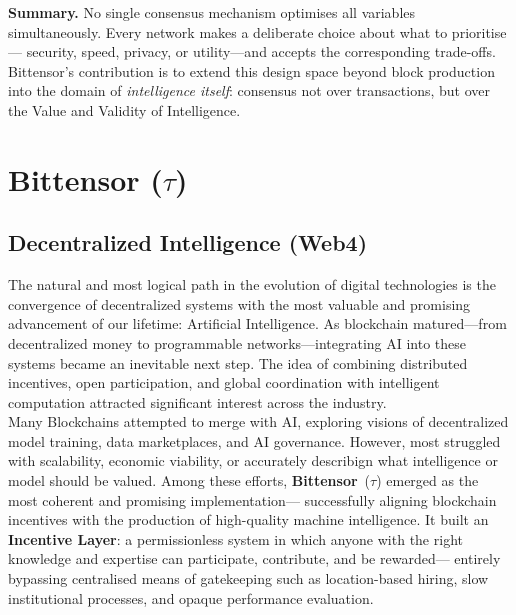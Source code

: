 \documentclass[12pt, a4paper, oneside]{report}
\newcommand{\TAO}{$\tau$}            %
\theoremstyle{definition}
\begin{document}
\vspace{0.4cm}
\noindent\textbf{Summary.} No single consensus mechanism optimises all variables 
simultaneously. Every network makes a deliberate choice about what to prioritise—
security, speed, privacy, or utility—and accepts the corresponding trade-offs. 
Bittensor's contribution is to extend this design space beyond block production 
into the domain of \emph{intelligence itself}: consensus not over transactions, 
but over the Value and Validity of Intelligence.








\chapter{Bittensor (\TAO)}
\label{chap:bittensor}

\section{Decentralized Intelligence (Web4)}
\label{sec:web4}

The natural and most logical path in the evolution of digital technologies is the 
convergence of decentralized systems with the most valuable and promising advancement 
of our lifetime: Artificial Intelligence. As blockchain matured—from decentralized 
money to programmable networks—integrating AI into these systems became an inevitable 
next step. The idea of combining distributed incentives, open participation, and global 
coordination with intelligent computation attracted significant interest across the 
industry.\\[0.4cm]

Many Blockchains attempted to merge with AI, exploring visions of decentralized 
model training, data marketplaces, and AI governance. However, most struggled with 
scalability, economic viability, or accurately describign what intelligence or model should be valued. Among these efforts, 
\textbf{Bittensor}~(\TAO) emerged as the most coherent and promising implementation—
successfully aligning blockchain incentives with the production of high-quality machine 
intelligence. It built an \textbf{Incentive Layer}: a permissionless system in which anyone 
with the right knowledge and expertise can participate, contribute, and be rewarded—
entirely bypassing centralised means of gatekeeping such as location-based hiring, 
slow institutional processes, and opaque performance evaluation.\\[0.4cm]
\end{document}
